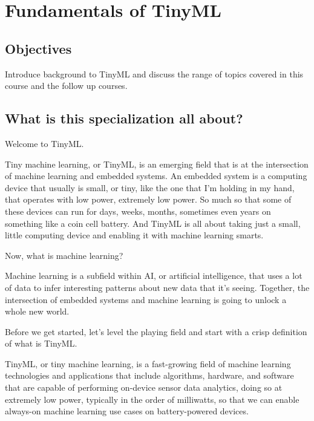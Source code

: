 



\chapter{Fundamentals of TinyML}

\section{Objectives}

Introduce background to TinyML and discuss the range of topics covered in this course and the follow up courses.

\section{What is this specialization all about?}

 Welcome to TinyML.
 
Tiny machine learning, or TinyML, is an emerging field that is at the intersection of machine learning and embedded systems.
An embedded system is a computing device that usually is small, or tiny, like the one that I'm holding in my hand, that operates with low power, extremely low power.
So much so that some of these devices can run for days, weeks, months, sometimes even years on something like a coin cell battery.
And TinyML is all about taking just a small, little computing device and enabling it with machine learning smarts.

Now, what is machine learning?

Machine learning is a subfield within AI, or artificial intelligence, that uses a lot of data to infer interesting patterns about new data that it's seeing.
Together, the intersection of embedded systems and machine learning is going to unlock a whole new world.



Before we get started, let's level the playing field and start with a crisp definition of what is TinyML.

TinyML, or tiny machine learning, is a fast-growing field of machine learning technologies and applications that include algorithms, hardware, and software that are capable of performing on-device sensor data analytics, doing so at extremely low power, typically in the order of milliwatts, so that we can enable always-on machine learning use cases on battery-powered devices.

